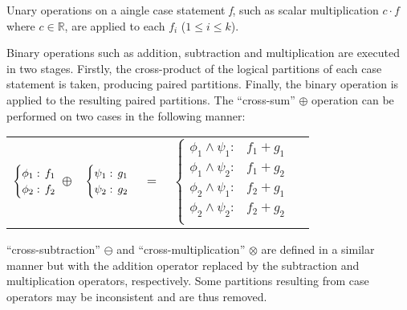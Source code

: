 Unary operations on a aingle case statement \emph{f}, such as scalar 
multiplication $c \cdot f$ where $ c \in \mathbb{R} $, are applied to each $f_i$ ($1 \leq i \leq k$). 

Binary operations such as addition, subtraction and multiplication are executed 
in two stages. Firstly, the cross-product of the logical partitions of each case statement 
is taken, producing paired partitions. Finally, the binary operation 
is applied to the resulting paired partitions. The ``cross-sum'' $\oplus$
operation can be performed on two cases in the following manner:

{\small 
\abovedisplayskip=0pt
\belowdisplayskip=0pt
\begin{center}
  \begin{tabular}{r c c c l}
    $\begin{cases}
        \phi_1: \hspace{-1mm} & \hspace{-1mm} f_1  \\ 
        \phi_2: \hspace{-1mm} & \hspace{-1mm} f_2  \\ 
    \end{cases}$
  $\oplus$
  &
  \hspace{-4mm}
    $\begin{cases}
        \psi_1: \hspace{-1mm} & \hspace{-1mm} g_1  \\ 
        \psi_2: \hspace{-1mm} & \hspace{-1mm} g_2  \\ 
    \end{cases}$
  &
  \hspace{-4mm} 
  $ = $
  &
  \hspace{-4mm}
    $\begin{cases}
      \phi_1 \wedge \psi_1: & f_1 + g_1 \\
      \phi_1 \wedge \psi_2: & f_1 + g_2 \\
      \phi_2 \wedge \psi_1: & f_2 + g_1 \\
      \phi_2 \wedge \psi_2: & f_2 + g_2  \\
    \end{cases}$
  \end{tabular}
\end{center}
}%

``cross-subtraction''  $\ominus$ and ``cross-multiplication'' $\otimes$
are defined in a similar manner but with the addition operator replaced
by the subtraction and multiplication operators, respectively.
Some partitions resulting from case operators may be inconsistent and 
are thus removed. 

